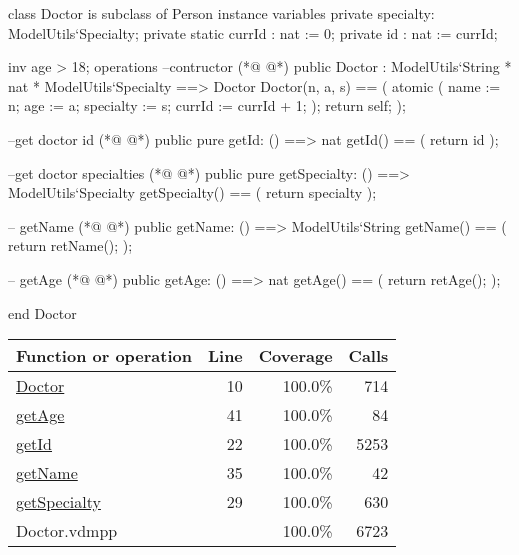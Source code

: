 \begin{vdmpp}[breaklines=true]
class Doctor is subclass of Person
instance variables
 private specialty: ModelUtils`Specialty;
 private static currId : nat := 0;
 private id : nat := currId;
 
 inv age > 18;
operations
 --contructor
(*@
\label{Doctor:10}
@*)
  public Doctor : ModelUtils`String * nat * ModelUtils`Specialty ==> Doctor
  Doctor(n, a, s) == (
   atomic (
    name := n;
    age := a;
    specialty := s;
    currId := currId + 1;
   );
   return self;
  );
  
  --get doctor id
(*@
\label{getId:22}
@*)
  public pure getId: () ==> nat
  getId() == (
   return id
  );
  
  
  --get doctor specialties
(*@
\label{getSpecialty:29}
@*)
  public pure getSpecialty: () ==> ModelUtils`Specialty
  getSpecialty() == (
   return specialty
  );
  
  -- getName
(*@
\label{getName:35}
@*)
  public getName: () ==> ModelUtils`String
  getName() == (
    return retName();  
  );

  -- getAge 
(*@
\label{getAge:41}
@*)
  public getAge: () ==> nat
  getAge() == (
    return retAge();  
  );

end Doctor
\end{vdmpp}
\bigskip
\begin{longtable}{|l|r|r|r|}
\hline
Function or operation & Line & Coverage & Calls \\
\hline
\hline
\hyperref[Doctor:10]{Doctor} & 10&100.0\% & 714 \\
\hline
\hyperref[getAge:41]{getAge} & 41&100.0\% & 84 \\
\hline
\hyperref[getId:22]{getId} & 22&100.0\% & 5253 \\
\hline
\hyperref[getName:35]{getName} & 35&100.0\% & 42 \\
\hline
\hyperref[getSpecialty:29]{getSpecialty} & 29&100.0\% & 630 \\
\hline
\hline
Doctor.vdmpp & & 100.0\% & 6723 \\
\hline
\end{longtable}

